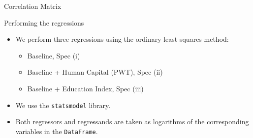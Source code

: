 \documentclass{beamer}
\begin{document}
\begin{frame}{Correlation Matrix}
\end{frame}


\begin{frame}{Performing the regressions}
	\begin{itemize}
		\item We perform three regressions using the ordinary least squares method:
		\begin{itemize}
			\item Baseline, Spec (i)
			\item Baseline + Human Capital (PWT), Spec (ii)
			\item Baseline + Education Index, Spec (iii)
		\end{itemize}
		\item We use the \texttt{statsmodel} library.
		\item Both regressors and regressands are taken as logarithms of the corresponding variables in the \texttt{DataFrame}.
	\end{itemize}
\end{frame}
\end{document}
